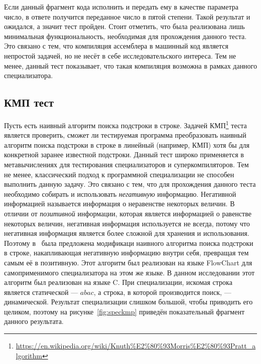 Если данный фрагмент кода исполнить и передать ему в качестве параметра число, в ответе получится переданное число в пятой степени. Такой результат и ожидался, а значит тест пройден. Стоит отметить, что была реализована лишь минимальная функциональность, необходимая для прохождения данного теста. Это связано с тем, что компиляция ассемблера в машинный код является непростой задачей, но не несёт в себе исследовательского интереса. Тем не менее, данный тест показывает, что такая компиляция возможна в рамках данного специализатора.


\subsection{КМП тест}
Пусть есть наивный алгоритм поиска подстроки в строке.
Задачей КМП\footnote{\url{https://en.wikipedia.org/wiki/Knuth\%E2\%80\%93Morris\%E2\%80\%93Pratt\_algorithm}} теста является проверить,
сможет ли тестируемая программа преобразовать наивный алгоритм поиска подстроки в строке в линейный (например, КМП) хотя бы
для конкретной заранее известной подстроки.
Данный тест широко применяется в метавычислениях для тестирования специализаторов и суперкомпиляторов.
Тем не менее, классический подход к программной специализации не способен выполнить данную задачу.
Это связано с тем, что для прохождения данного теста необходимо собирать и использовать \emph{негативную} информацию.
Негативной информацией называется информация о неравенстве некоторых величин.
В отличии от \emph{позитивной} информации, которая является информацией о равенстве некоторых величин,
негативная информация используется не всегда, потому что негативная информация является более сложной для
хранения и использования.
Поэтому в~\cite{PEAPG} была предложена модификаци наивного алгоритма поиска подстроки в строке,
накапливающая негативную информацию внутри себя, превращая тем самым её в позитивную.
Этот алгоритм был реализован на языке \textsf{FlowChart} для самоприменимого специализатора на этом же языке. В данном исследовании этот алгоритм был реализован на языке \textsf{C}.  При специализации, искомая строка является статической --- $abac$, а строка, в которой производится поиск, --- динамической. Результат специализации слишком большой, чтобы приводить его целиком, поэтому на рисунке~\ref{fig:speckmp} приведён показательный фрагмент данного результата. 

